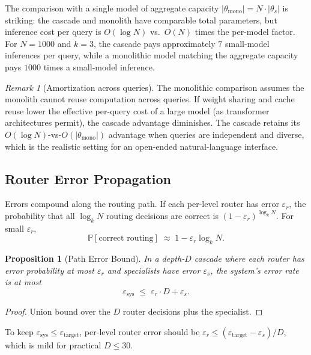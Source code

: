 \documentclass[11pt,a4paper]{article}
\newtheorem{proposition}[theorem]{Proposition}
\theoremstyle{definition}
\theoremstyle{remark}
\newtheorem{remark}[theorem]{Remark}
\renewcommand{\Pr}{\mathbb{P}}
\begin{document}
The comparison with a single model of aggregate capacity $|\theta_{\text{mono}}| = N \cdot |\theta_s|$ is striking: the cascade and monolith have comparable total parameters, but inference cost per query is $O(\log N)$ vs.\ $O(N)$ times the per-model factor. For $N = 1000$ and $k = 3$, the cascade pays approximately $7$ small-model inferences per query, while a monolithic model matching the aggregate capacity pays $1000$ times a small-model inference.

\begin{remark}[Amortization across queries]
The monolithic comparison assumes the monolith cannot reuse computation across queries. If weight sharing and cache reuse lower the effective per-query cost of a large model (as transformer architectures permit), the cascade advantage diminishes. The cascade retains its $O(\log N)$-vs-$O(|\theta_{\text{mono}}|)$ advantage when queries are independent and diverse, which is the realistic setting for an open-ended natural-language interface.
\end{remark}

\subsection{Router Error Propagation}

Errors compound along the routing path. If each per-level router has error $\varepsilon_r$, the probability that all $\log_k N$ routing decisions are correct is $(1 - \varepsilon_r)^{\log_k N}$. For small $\varepsilon_r$,
\[
\Pr[\text{correct routing}] \;\approx\; 1 - \varepsilon_r \log_k N.
\]

\begin{proposition}[Path Error Bound]
\label{prop:path-error}
In a depth-$D$ cascade where each router has error probability at most $\varepsilon_r$ and specialists have error $\varepsilon_s$, the system's error rate is at most
\[
\varepsilon_{\text{sys}} \;\leq\; \varepsilon_r \cdot D + \varepsilon_s.
\]
\end{proposition}

\begin{proof}
Union bound over the $D$ router decisions plus the specialist.
\end{proof}

To keep $\varepsilon_{\text{sys}} \leq \varepsilon_{\text{target}}$, per-level router error should be $\varepsilon_r \leq (\varepsilon_{\text{target}} - \varepsilon_s) / D$, which is mild for practical $D \leq 30$.
\end{document}
